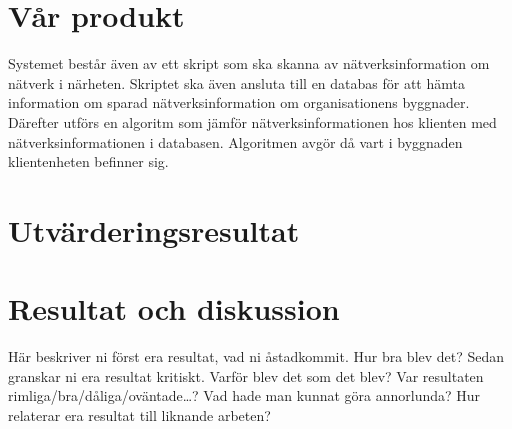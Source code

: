 \documentclass[swedish, a4paper,12pt]{article}
\begin{document}
\section{Vår produkt}

\iffalse
\section{DEL x}\label{sec:delX}

\section{DEL x+1}
\section{DEL x+2}

\fi
Systemet består även av ett skript som ska skanna av nätverksinformation om nätverk i närheten. Skriptet ska även ansluta till en databas för att hämta information om sparad nätverksinformation om organisationens byggnader. Därefter utförs en algoritm som jämför nätverksinformationen hos klienten med nätverksinformationen i databasen. Algoritmen avgör då vart i byggnaden klientenheten befinner sig.

\section{Utvärderingsresultat}

\section{Resultat och diskussion}
\iffalse Här beskriver ni först era resultat, vad ni åstadkommit.  Hur bra blev det?
Sedan granskar ni era resultat kritiskt.  Varför blev det som det blev?  Var resultaten rimliga/bra/dåliga/o\-vän\-ta\-de\ldots?
Vad hade man kunnat göra annorlunda?  Hur relaterar era resultat till liknande arbeten?
\end{document}
